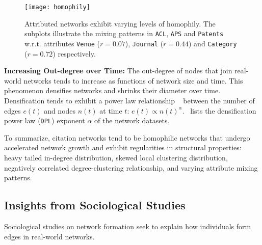 
\begin{figure}
 \centering
 \texttt{[image: homophily]}
 \caption{
    Attributed networks exhibit varying levels of homophily. The subplots
    illustrate the mixing patterns in \texttt{ACL}, \texttt{APS} and \texttt{Patents}
    w.r.t. attributes \texttt{Venue} ($r=0.07$), \texttt{Journal} ($r=0.44$) and
    \texttt{Category} ($r=0.72$) respectively.
 }
 \label{fig:mixing}
 \vspace{-15pt}
\end{figure}

\textbf{Increasing Out-degree over Time:}
The out-degree of nodes that join real-world networks tends to increase
as functions of network size and time. This phenomenon densifies networks and shrinks their
diameter over time. Densification tends to exhibit a power law relationship
~\cite{leskovec2005graphs} between the number of edges $e(t)$ and nodes $n(t)$ at time $t$: $e(t) \propto n(t)^{\alpha}$.~ lists the densification power law (\texttt{DPL}) exponent $\alpha$ of the network datasets.

To summarize, citation networks tend to be homophilic networks that undergo
accelerated network growth and exhibit regularities in structural properties:
heavy tailed in-degree distribution, skewed local clustering distribution,
negatively correlated degree-clustering relationship, and varying attribute
mixing patterns.



\subsection{Insights from Sociological Studies}

Sociological studies on network formation seek to explain
how individuals form edges in real-world networks.

